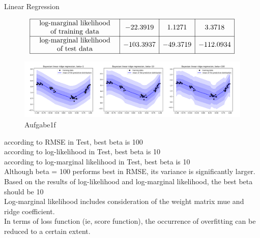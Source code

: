 \documentclass[
	ngerman,
     solution=true
	]{tudaexercise}
\begin{document}
\begin{task}{Linear Regression}
\begin{subtask}[1f)]
\[\begin{array}{|c|c|c|c|}
\hline \begin{array}{c}
\text { log-marginal likelihood } \\
\text { of training data }
\end{array} & -22.3919 & 1.1271 & 3.3718 \\
\hline \begin{array}{c}
\text { log-marginal likelihood } \\
\text { of test data }
\end{array} & -103.3937 & -49.3719 & -112.0934 \\
\hline
\end{array}
\]
\begin{figure}[H] 
\centering 
\includegraphics[width=1\textwidth]{Aufgabe_1f.png} 
\caption{Aufgabe1f } 
\label{Fig.main3}
\end{figure}
according to RMSE in Test, best beta is 100 \\
according to log-likelihood in Test, best beta is 10 \\
according to log-marginal likelihood in Test, best beta is 10 \\
Although beta = 100 performs best in RMSE, its variance is significantly larger. Based on the results of log-likelihood and log-marginal likelihood, the best beta should be 10 \\

Log-marginal likelihood includes consideration of the weight matrix mue and ridge coefficient.\\
In terms of loss function (ie, score function), the occurrence of overfitting can be reduced to a certain extent.\\
\end{subtask}
\end{task}
\newpage
\end{document}
